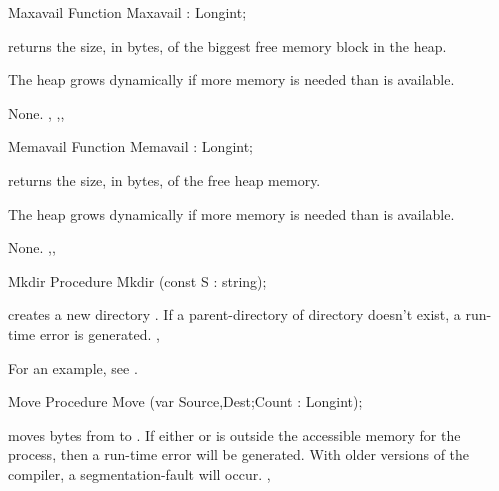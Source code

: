 \documentclass{report}
\begin{document}

\begin{function}{Maxavail}
\Declaration
Function Maxavail  : Longint;

\Description
{} returns the size, in bytes, of the biggest free memory block in
the heap.
\begin{remark}
The heap grows dynamically if more memory is needed than is available.
\end{remark}
\Errors
None.
\SeeAlso
{}, ,, 
\end{function}


\begin{function}{Memavail}
\Declaration
Function Memavail  : Longint;

\Description
{} returns the size, in bytes, of the free heap memory.
\begin{remark}
The heap grows dynamically if more memory is needed than is available.
\end{remark}
\Errors
None.
\SeeAlso
{},, 
\end{function}


\begin{procedure}{Mkdir}
\Declaration
Procedure Mkdir (const S : string);

\Description
{} creates a new  directory .
\Errors
If a parent-directory of directory  doesn't exist, a run-time error is generated.
\SeeAlso
{}, 
\end{procedure}
For an example, see .
\begin{procedure}{Move}
\Declaration
Procedure Move (var Source,Dest;Count : Longint);

\Description
{} moves  bytes from  to .
\Errors
If either  or  is outside the accessible memory for
the process, then a run-time error will be generated. With older versions of
the compiler, a segmentation-fault will occur.
\SeeAlso
{}, 
\end{procedure}

\end{document}
